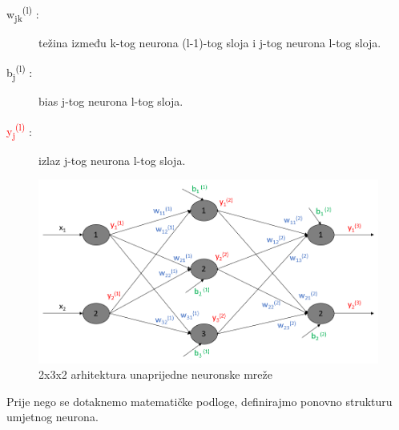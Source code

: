 \documentclass[times, utf8, zavrsni]{fer}
\begin{document}
\begin{description}
\item[\textcolor{myblue}{w\textsubscript{jk}\textsuperscript{(l)}} :] težina između k-tog neurona (l-1)-tog sloja i j-tog neurona l-tog sloja.
\item[\textcolor{mygreen}{b\textsubscript{j}\textsuperscript{(l)}} :] bias j-tog neurona l-tog sloja.
\item[\textcolor{red}{y\textsubscript{j}\textsuperscript{(l)}} :] izlaz j-tog neurona l-tog sloja.
\end{description}

\begin{figure}[H]
    \centering
    \includegraphics[scale=0.55]{img/ffann.png}
    \caption[Caption for LOF]{2x3x2 arhitektura unaprijedne neuronske mreže\footnotemark}
    \label{fig:ffann}
\end{figure}

Prije nego se dotaknemo matematičke podloge, definirajmo ponovno strukturu umjetnog neurona.
\end{document}
